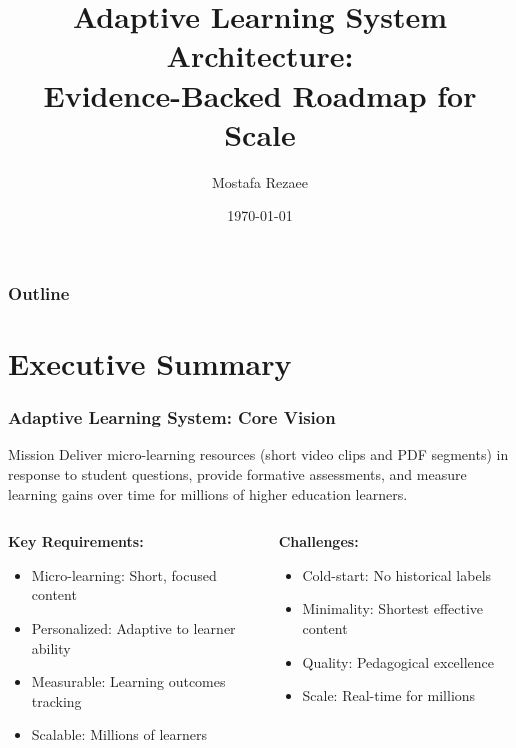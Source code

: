 \documentclass[aspectratio=169]{beamer}
\title{Adaptive Learning System Architecture:\\Evidence-Backed Roadmap for Scale}
\author{Mostafa Rezaee}
\institute{Pearson Company\\Manager: Hamid Bagheri}
\date{\today}
\begin{document}
\begin{frame}
\titlepage
\end{frame}

\begin{frame}
\frametitle{Outline}
\tableofcontents
\end{frame}

\section{Executive Summary}

\begin{frame}
\frametitle{Adaptive Learning System: Core Vision}
\begin{block}{Mission}
Deliver micro-learning resources (short video clips and PDF segments) in response to student questions, provide formative assessments, and measure learning gains over time for millions of higher education learners.
\end{block}

\begin{columns}
\begin{column}{0.5\textwidth}
\textbf{Key Requirements:}
\begin{itemize}
\item \textcolor{myblue}{Micro-learning:} Short, focused content
\item \textcolor{mygreen}{Personalized:} Adaptive to learner ability
\item \textcolor{mypurple}{Measurable:} Learning outcomes tracking
\item \textcolor{myorange}{Scalable:} Millions of learners
\end{itemize}
\end{column}
\begin{column}{0.5\textwidth}
\textbf{Challenges:}
\begin{itemize}
\item \textcolor{myred}{Cold-start:} No historical labels
\item \textcolor{myred}{Minimality:} Shortest effective content
\item \textcolor{myred}{Quality:} Pedagogical excellence
\item \textcolor{myred}{Scale:} Real-time for millions
\end{itemize}
\end{column}
\end{columns}
\end{frame}
\end{document}
